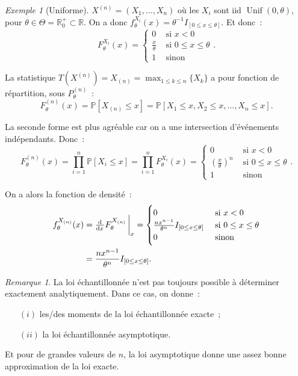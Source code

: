 \documentclass{report}
\DeclareMathOperator{\Unif}{Unif}  %
\renewcommand{\P}{\mathbb P}
\newcommand{\R}{\mathbb R}
\newcommand{\charfun}[1]{I_{\left[#1\right]}}
\theoremstyle{definition}
\theoremstyle{remark}
\newtheorem*{rmq}{Remarque}
\newtheorem{ex}{Exemple}[chapter]
\begin{document}
		\begin{ex}[Uniforme] $X^{(n)} = (X_1, \ldots, X_n)$ où les $X_i$ sont iid $\Unif(0, \theta)$, pour $\theta \in \Theta = \R^+_0 \subset \R$.
		On a donc $f_\theta^{X_i}(x) = \theta^{-1}\charfun {0 \leq x \leq \theta}$. Et donc~:
		\[F_\theta^{X_i}(x) = \begin{cases}0 &\text{ si } x < 0 \\\frac x\theta &\text{ si } 0 \leq x \leq \theta \\1 &\text{ sinon}\end{cases}.\]

		La statistique $T(X^{(n)}) = X_{(n)} = \max_{1 \leq k \leq n}\{X_k\}$ a pour fonction de répartition, sous $P_\theta^{(n)}$~:
		\[F_\theta^{(n)}(x) = \P[X_{(n)} \leq x] = \P[X_1 \leq x, X_2 \leq x, \ldots, X_n \leq x].\]

		La seconde forme est plus agréable car on a une intersection d'événements indépendants. Donc~:
		\[F_\theta^{(n)}(x) = \prod_{i=1}^n\P[X_i \leq x] = \prod_{i=1}^nF_\theta^{X_i}(x) =
			\begin{cases}0 &\text{ si } x < 0 \\\left(\frac x\theta\right)^n &\text{ si } 0 \leq x \leq \theta \\1 &\text{ sinon}\end{cases}.\]

		On a alors la fonction de densité~:
		\begin{align*}
			f_\theta^{X_{(n)}}(x) &= \od {}xF_\theta^{X_{(n)}}\sVert[3]_x =
			\begin{cases}0 &\text{ si } x < 0 \\\frac {nx^{n-1}}{\theta^n}\charfun{0 \leq x \leq \theta} &\text{ si } 0\leq x \leq \theta \\0 &\text{ sinon}\end{cases} \\
			&= \frac {nx^{n-1}}{\theta^n}\charfun{0 \leq x \leq \theta}.
		\end{align*}
		\end{ex}

		\begin{rmq} La loi échantillonnée n'est pas toujours possible à déterminer exactement analytiquement. Dans ce cas, on donne~:
		\begin{itemize}
			\item[$(i)$] les/des moments de la loi échantillonnée exacte~;
			\item[$(ii)$] la loi échantillonnée asymptotique.
		\end{itemize}

		Et pour de grandes valeurs de $n$, la loi asymptotique donne une assez bonne approximation de la loi exacte.
		\end{rmq}
\end{document}
